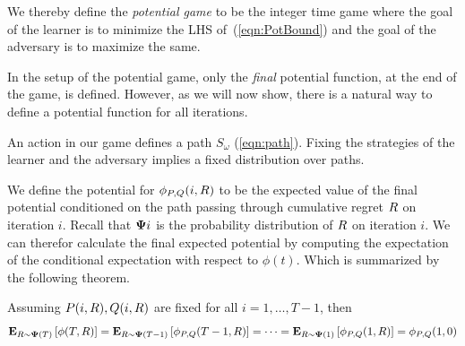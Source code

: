 \documentclass{article}[12pt]
\begin{document}
 We thereby define the {\em potential game} to be the 
 integer time game where the goal of the learner is to minimize the
 LHS of~(\ref{eqn:PotBound}) and the goal of the adversary is to maximize the same.
 
 \newcommand{\potPQ}{\pot_{\learnerM,\adversM}}

 In the setup of the potential game, only the {\em final} potential
 function, at the end of the game, is defined. However, as we will now
 show, there is a natural way to define a potential function for all
 iterations.

An action in our game defines a path $S_\omega$
(\ref{eqn:path}). Fixing the strategies of the learner and the
adversary implies a fixed distribution over paths.

We define the potential for $\potPQ(i,\R)$ to be the expected value of
the final potential conditioned on the path passing through cumulative
regret $R$ on iteration $i$. Recall that ${\bf \Psi}{i}$ is the
probability distribution of $R$ on iteration $i$. We can therefor
calculate the final expected potential by computing the expectation of
the conditional expectation with respect to $\phi(t)$. Which is
summarized by the following theorem.

\begin{theorem} \label{thm:backward-recursion}
Assuming $ P(i,R), Q(i,R)$ are fixed for all
$i=1,\ldots,T-1$, then
\[
  \E{\R \sim \state(T)}{\pot(T,R)} = \E{\R \sim
    \state(T-1)}{\potPQ(T-1,R)} = \cdots =  \E{\R \sim
    \state(1)}{\potPQ(1,R)} = \potPQ(1,0)
  \]
\end{theorem}
\end{document}
